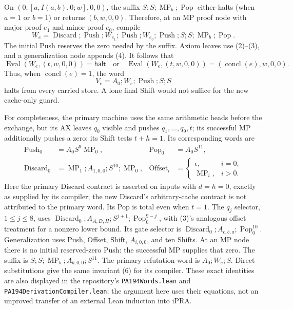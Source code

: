 On $(0,[a,I(a,b),0;w],0,0)$, the suffix
$S;S;\operatorname{MP}_b;\operatorname{Pop}$ either halts
(when $a=1$ or $b=1$) or returns $(b,w,0,0)$.  Therefore, at an
MP proof node with major proof $e_1$ and minor proof $e_0$, compile
\[
 W_e=\operatorname{Discard};\operatorname{Push};W_{e_1};
       \operatorname{Push};W_{e_0};\operatorname{Push};
                 S;S;\operatorname{MP}_b;\operatorname{Pop}.  \tag{5}
\]
The initial Push reserves the zero needed by the suffix.  Axiom leaves
use (2)--(3), and a generalization node appends (4).  It follows that
\[
 \operatorname{Eval}(W_e,(t,w,0,0))=\mathsf{halt}
 \quad\text{or}\quad
 \operatorname{Eval}(W_e,(t,w,0,0))=(\operatorname{concl}(e),w,0,0).
                                                               \tag{6}
\]
Thus, when $\operatorname{concl}(e)=1$, the word
\[
             V_e=A_0;W_e;\operatorname{Push};S;S            \tag{7}
\]
halts from every carried store.  A lone final Shift would not suffice
for the new cache-only guard.

For completeness, the primary machine uses the same arithmetic heads
before the exchange, but its AX leaves $q_0$ visible and pushes
$q_1,\ldots,q_9,t$; its successful MP additionally pushes a zero;
its Shift tests $t+h=1$.  Its corresponding words are
\begin{align*}
 \operatorname{Push}_0&=A_0S^9\operatorname{MP}_0,&
 \operatorname{Pop}_0&=A_0S^{11},\\
 \operatorname{Discard}_0&=\operatorname{MP}_1;
       A_{1,0,0};S^{10};\operatorname{MP}_0,&
 \operatorname{Offset}_i&=
      \begin{cases}\epsilon,&i=0,\\\operatorname{MP}_i,&i>0.
      \end{cases}
\end{align*}
Here the primary Discard contract is asserted on inputs with
$d=h=0$, exactly as supplied by its compiler; the new Discard's
arbitrary-cache contract is not attributed to the primary word.
Its Pop is total even when $t=1$.  The $q_j$ selector, $1\leq j\leq8$,
uses $\operatorname{Discard}_0;A_{A,D,H};S^{j+1};
\operatorname{Pop}_0^{9-j}$, with (3)'s analogous offset treatment
for a nonzero lower bound.  Its gate selector is
$\operatorname{Discard}_0;A_{c,b,a};\operatorname{Pop}_0^{10}$.
Generalization uses Push, Offset, Shift, $A_{i,0,0}$, and ten Shifts.
At an MP node there is no initial reserved-zero Push: the successful
MP supplies that zero.  The suffix is
$S;S;\operatorname{MP}_b;A_{b,0,0};S^{11}$.
The primary refutation word is $A_0;W_e;S$.
Direct substitutions give the same invariant (6) for its compiler.
These exact identities are also displayed in the repository's
\texttt{PA194Words.lean} and \texttt{PA194DerivationCompiler.lean};
the argument here uses their equations, not an unproved transfer of
an external Lean induction into iPRA.

